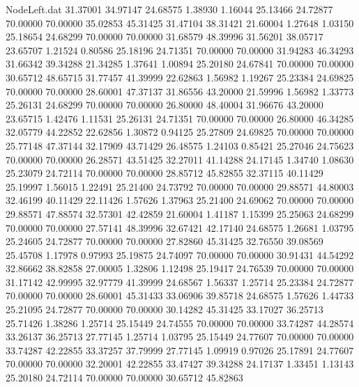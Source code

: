 \begin{filecontents}{NodeLeft.dat}
  31.37001   34.97147   24.68575     1.38930    1.16044   25.13466   24.72877   70.00000   70.00000   35.02853   45.31425
  31.47104   38.31421   21.60004     1.27648    1.03150   25.18654   24.68299   70.00000   70.00000   31.68579   48.39996
  31.56201   38.05717   23.65707     1.21524    0.80586   25.18196   24.71351   70.00000   70.00000   31.94283   46.34293
  31.66342   39.34288   21.34285     1.37641    1.00894   25.20180   24.67841   70.00000   70.00000   30.65712   48.65715
  31.77457   41.39999   22.62863     1.56982    1.19267   25.23384   24.69825   70.00000   70.00000   28.60001   47.37137
  31.86556   43.20000   21.59996     1.56982    1.33773   25.26131   24.68299   70.00000   70.00000   26.80000   48.40004
  31.96676   43.20000   23.65715     1.42476    1.11531   25.26131   24.71351   70.00000   70.00000   26.80000   46.34285
  32.05779   44.22852   22.62856     1.30872    0.94125   25.27809   24.69825   70.00000   70.00000   25.77148   47.37144
  32.17909   43.71429   26.48575     1.24103    0.85421   25.27046   24.75623   70.00000   70.00000   26.28571   43.51425
  32.27011   41.14288   24.17145     1.34740    1.08630   25.23079   24.72114   70.00000   70.00000   28.85712   45.82855
  32.37115   40.11429   25.19997     1.56015    1.22491   25.21400   24.73792   70.00000   70.00000   29.88571   44.80003
  32.46199   40.11429   22.11426     1.57626    1.37963   25.21400   24.69062   70.00000   70.00000   29.88571   47.88574
  32.57301   42.42859   21.60004     1.41187    1.15399   25.25063   24.68299   70.00000   70.00000   27.57141   48.39996
  32.67421   42.17140   24.68575     1.26681    1.03795   25.24605   24.72877   70.00000   70.00000   27.82860   45.31425
  32.76550   39.08569   25.45708     1.17978    0.97993   25.19875   24.74097   70.00000   70.00000   30.91431   44.54292
  32.86662   38.82858   27.00005     1.32806    1.12498   25.19417   24.76539   70.00000   70.00000   31.17142   42.99995
  32.97779   41.39999   24.68567     1.56337    1.25714   25.23384   24.72877   70.00000   70.00000   28.60001   45.31433
  33.06906   39.85718   24.68575     1.57626    1.44733   25.21095   24.72877   70.00000   70.00000   30.14282   45.31425
  33.17027   36.25713   25.71426     1.38286    1.25714   25.15449   24.74555   70.00000   70.00000   33.74287   44.28574
  33.26137   36.25713   27.77145     1.25714    1.03795   25.15449   24.77607   70.00000   70.00000   33.74287   42.22855
  33.37257   37.79999   27.77145     1.09919    0.97026   25.17891   24.77607   70.00000   70.00000   32.20001   42.22855
  33.47427   39.34288   24.17137     1.33451    1.13143   25.20180   24.72114   70.00000   70.00000   30.65712   45.82863

\end{filecontents}
